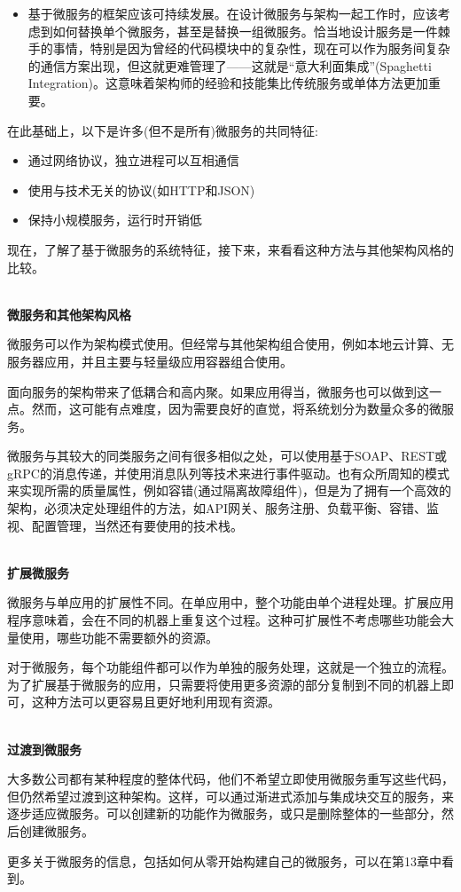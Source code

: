 \begin{itemize}
\item
基于微服务的框架应该可持续发展。在设计微服务与架构一起工作时，应该考虑到如何替换单个微服务，甚至是替换一组微服务。恰当地设计服务是一件棘手的事情，特别是因为曾经的代码模块中的复杂性，现在可以作为服务间复杂的通信方案出现，但这就更难管理了——这就是“意大利面集成”(Spaghetti Integration)。这意味着架构师的经验和技能集比传统服务或单体方法更加重要。

\end{itemize}

在此基础上，以下是许多(但不是所有)微服务的共同特征:

\begin{itemize}
\item	
通过网络协议，独立进程可以互相通信
	
\item
使用与技术无关的协议(如HTTP和JSON)

\item
保持小规模服务，运行时开销低
\end{itemize}

现在，了解了基于微服务的系统特征，接下来，来看看这种方法与其他架构风格的比较。

\hspace*{\fill} \\ %
\noindent
\textbf{微服务和其他架构风格}

微服务可以作为架构模式使用。但经常与其他架构组合使用，例如本地云计算、无服务器应用，并且主要与轻量级应用容器组合使用。

面向服务的架构带来了低耦合和高内聚。如果应用得当，微服务也可以做到这一点。然而，这可能有点难度，因为需要良好的直觉，将系统划分为数量众多的微服务。

微服务与其较大的同类服务之间有很多相似之处，可以使用基于SOAP、REST或gRPC的消息传递，并使用消息队列等技术来进行事件驱动。也有众所周知的模式来实现所需的质量属性，例如容错(通过隔离故障组件)，但是为了拥有一个高效的架构，必须决定处理组件的方法，如API网关、服务注册、负载平衡、容错、监视、配置管理，当然还有要使用的技术栈。

\hspace*{\fill} \\ %
\noindent
\textbf{扩展微服务}

微服务与单应用的扩展性不同。在单应用中，整个功能由单个进程处理。扩展应用程序意味着，会在不同的机器上重复这个过程。这种可扩展性不考虑哪些功能会大量使用，哪些功能不需要额外的资源。

对于微服务，每个功能组件都可以作为单独的服务处理，这就是一个独立的流程。为了扩展基于微服务的应用，只需要将使用更多资源的部分复制到不同的机器上即可，这种方法可以更容易且更好地利用现有资源。

\hspace*{\fill} \\ %
\noindent
\textbf{过渡到微服务}

大多数公司都有某种程度的整体代码，他们不希望立即使用微服务重写这些代码，但仍然希望过渡到这种架构。这样，可以通过渐进式添加与集成块交互的服务，来逐步适应微服务。可以创建新的功能作为微服务，或只是删除整体的一些部分，然后创建微服务。 

更多关于微服务的信息，包括如何从零开始构建自己的微服务，可以在第13章中看到。













